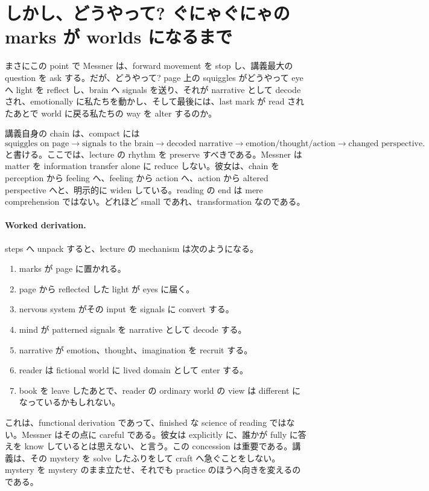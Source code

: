 \section{しかし、どうやって? ぐにゃぐにゃの marks が worlds になるまで}

まさにこの point で Messner は、forward movement を stop し、講義最大の question を ask する。だが、どうやって? page 上の squiggles がどうやって eye へ light を reflect し、brain へ signals を送り、それが narrative として decode され、emotionally に私たちを動かし、そして最後には、last mark が read されたあとで world に戻る私たちの way を alter するのか。

講義自身の chain は、compact には
\begin{equation}
\text{squiggles on page} \to \text{signals to the brain} \to \text{decoded narrative} \to \text{emotion/thought/action} \to \text{changed perspective}.
\end{equation}
と書ける。ここでは、lecture の rhythm を preserve すべきである。Messner は matter を information transfer alone に reduce しない。彼女は、chain を perception から feeling へ、feeling から action へ、action から altered perspective へと、明示的に widen している。reading の end は mere comprehension ではない。どれほど small であれ、transformation なのである。

\paragraph{Worked derivation.} steps へ unpack すると、lecture の mechanism は次のようになる。
\begin{enumerate}
\item marks が page に置かれる。
\item page から reflected した light が eyes に届く。
\item nervous system がその input を signals に convert する。
\item mind が patterned signals を narrative として decode する。
\item narrative が emotion、thought、imagination を recruit する。
\item reader は fictional world に lived domain として enter する。
\item book を leave したあとで、reader の ordinary world の view は different になっているかもしれない。
\end{enumerate}

これは、functional derivation であって、finished な science of reading ではない。Messner はその点に careful である。彼女は explicitly に、誰かが fully に答えを know しているとは思えない、と言う。この concession は重要である。講義は、その mystery を solve したふりをして craft へ急ぐことをしない。mystery を mystery のまま立たせ、それでも practice のほうへ向きを変えるのである。

